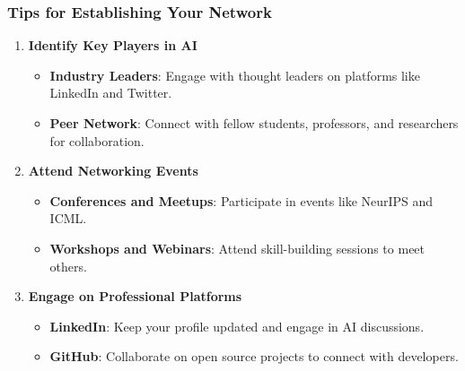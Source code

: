 \documentclass{beamer}
\begin{document}
\begin{frame}[fragile]
    \frametitle{Tips for Establishing Your Network}

    \begin{enumerate}
        \item \textbf{Identify Key Players in AI}
            \begin{itemize}
                \item \textbf{Industry Leaders}: Engage with thought leaders on platforms like LinkedIn and Twitter.
                \item \textbf{Peer Network}: Connect with fellow students, professors, and researchers for collaboration.
            \end{itemize}

        \item \textbf{Attend Networking Events}
            \begin{itemize}
                \item \textbf{Conferences and Meetups}: Participate in events like NeurIPS and ICML.
                \item \textbf{Workshops and Webinars}: Attend skill-building sessions to meet others.
            \end{itemize}

        \item \textbf{Engage on Professional Platforms}
            \begin{itemize}
                \item \textbf{LinkedIn}: Keep your profile updated and engage in AI discussions.
                \item \textbf{GitHub}: Collaborate on open source projects to connect with developers.
            \end{itemize}
    \end{enumerate}
\end{frame}
\end{document}

